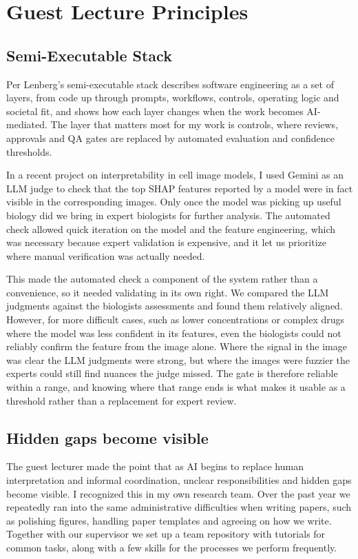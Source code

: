 \documentclass{article}
\begin{document}
\section{Guest Lecture Principles}
\subsection{Semi-Executable Stack}
Per Lenberg's semi-executable stack describes software engineering as a set of layers, from code up through prompts, workflows, controls, operating logic and societal fit, and shows how each layer changes when the work becomes AI-mediated. The layer that matters most for my work is controls, where reviews, approvals and QA gates are replaced by automated evaluation and confidence thresholds.

In a recent project on interpretability in cell image models, I used Gemini as an LLM judge to check that the top SHAP features reported by a model were in fact visible in the corresponding images. Only once the model was picking up useful biology did we bring in expert biologists for further analysis. The automated check allowed quick iteration on the model and the feature engineering, which was necessary because expert validation is expensive, and it let us prioritize where manual verification was actually needed.

This made the automated check a component of the system rather than a convenience, so it needed validating in its own right. We compared the LLM judgments against the biologists assessments and found them relatively aligned. However, for more difficult cases, such as lower concentrations or complex drugs where the model was less confident in its features, even the biologists could not reliably confirm the feature from the image alone. Where the signal in the image was clear the LLM judgments were strong, but where the images were fuzzier the experts could still find nuances the judge missed. The gate is therefore reliable within a range, and knowing where that range ends is what makes it usable as a threshold rather than a replacement for expert review.

\subsection{Hidden gaps become visible}
The guest lecturer made the point that as AI begins to replace human interpretation and informal coordination, unclear responsibilities and hidden gaps become visible. I recognized this in my own research team. Over the past year we repeatedly ran into the same administrative difficulties when writing papers, such as polishing figures, handling paper templates and agreeing on how we write. Together with our supervisor we set up a team repository with tutorials for common tasks, along with a few skills for the processes we perform frequently.
\end{document}
